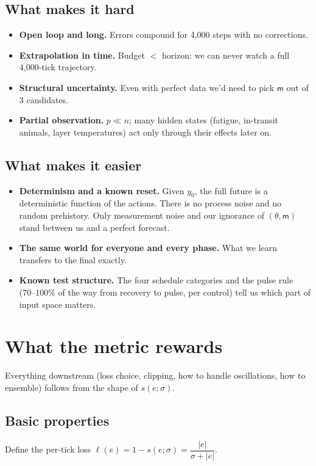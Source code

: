 \documentclass[11pt]{article}
\theoremstyle{plain}
\theoremstyle{definition}
\theoremstyle{remark}
\newcommand{\abs}[1]{\left\lvert #1 \right\rvert}
\begin{document}
\subsection{What makes it hard}
\begin{itemize}
\item \textbf{Open loop and long.} Errors compound for 4,000 steps with no corrections.
\item \textbf{Extrapolation in time.} Budget $<$ horizon: we can never watch a full 4,000-tick trajectory.
\item \textbf{Structural uncertainty.} Even with perfect data we'd need to pick $\mathsf m$ out of 3 candidates.
\item \textbf{Partial observation.} $p\ll n$; many hidden states (fatigue, in-transit animals, layer temperatures) act only through their effects later on.
\end{itemize}

\subsection{What makes it easier}
\begin{itemize}
\item \textbf{Determinism and a known reset.} Given $y_0$, the full future is a deterministic function of the actions. There is no process noise and no random prehistory. Only measurement noise and our ignorance of $(\theta,\mathsf m)$ stand between us and a perfect forecast.
\item \textbf{The same world for everyone and every phase.} What we learn transfers to the final exactly.
\item \textbf{Known test structure.} The four schedule categories and the pulse rule (70--100\% of the way from recovery to pulse, per control) tell us which part of input space matters.
\end{itemize}

\section{What the metric rewards}\label{sec:metric}

Everything downstream (loss choice, clipping, how to handle oscillations, how to ensemble) follows from the shape of $s(e;\sigma)$.

\subsection{Basic properties}
Define the per-tick loss $\ell(e)=1-s(e;\sigma)=\dfrac{\abs e}{\sigma+\abs e}$.
\end{document}
